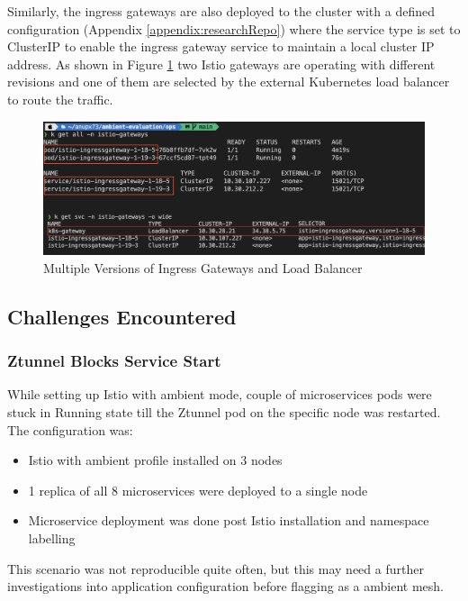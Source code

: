 Similarly, the ingress gateways are also deployed to the cluster with a defined configuration (Appendix \ref{appendix:researchRepo}) where the service type is set to ClusterIP to enable the ingress gateway service to maintain a local cluster IP address. As shown in Figure \ref{method:multiGateways} two Istio gateways are operating with different revisions and one of them are selected by the external Kubernetes load balancer to route the traffic.

\begin{figure}[ht!]
  \centering
  \includegraphics[width=1.0\linewidth]{resources/multi-gateways.png}
  \caption{Multiple Versions of Ingress Gateways and Load Balancer}
  \label{method:multiGateways}
\end{figure}

\subsection{Challenges Encountered}
\subsubsection{Ztunnel Blocks Service Start}
While setting up Istio with ambient mode, couple of microservices pods were stuck in Running state till the Ztunnel pod on the specific node was restarted. The configuration was:

\begin{itemize}
\item Istio with ambient profile installed on 3 nodes
\item 1 replica of all 8 microservices were deployed to a single node
\item Microservice deployment was done post Istio installation and namespace labelling
\end{itemize}

This scenario was not reproducible quite often, but this may need a further investigations into application configuration before flagging as a ambient mesh.

